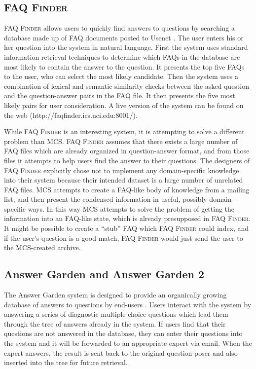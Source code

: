 \subsection{FAQ {\scshape Finder}}
FAQ {\scshape Finder} allows users to quickly find answers to questions by
searching a database made up of FAQ documents posted to Usenet \cite{Burke97}.
The user enters his or her question into the system in natural language. First
the system uses standard information retrieval techniques to determine which
FAQs in the database are most likely to contain the answer to the question. It
presents the top five FAQs to the user, who can select the most likely
candidate.  Then the system uses a combination of lexical and semantic
similarity checks between the asked question and the question-answer pairs in
the FAQ file. It then presents the five most likely pairs for user
consideration.  A live version of the system can be found on the web
(http://faqfinder.ics.uci.edu:8001/).

While FAQ {\scshape Finder} is an interesting system, it is attempting to solve
a different problem than MCS. FAQ {\scshape Finder} assumes that there exists a
large number of FAQ files which are already organized in question-answer
format, and from those files it attempts to help users find the answer to their
questions.  The designers of FAQ {\scshape Finder} explicitly chose not to
implement any domain-specific knowledge into their system because their
intended dataset is a large number of unrelated FAQ files. MCS attempts to
create a FAQ-like body of knowledge from a mailing list, and then present the
condensed information in useful, possibly domain-specific ways. In this way MCS
attempts to solve the problem of getting the information into an FAQ-like
state, which is already presupposed in FAQ {\scshape Finder}. It might be
possible to create a ``stub'' FAQ which FAQ {\scshape Finder} could index, and
if the user's question is a good match, FAQ {\scshape Finder} would just send
the user to the MCS-created archive.

\subsection{Answer Garden and Answer Garden 2}
\label{sec:answer-garden}
The Answer Garden system is designed to provide an organically growing database
of answers to questions by end-users \cite{Ackerman90}. Users interact with the
system by answering a series of diagnostic multiple-choice questions which lead
them through the tree of answers already in the system. If users find that
their questions are not answered in the database, they can enter their
questions into the system and it will be forwarded to an appropriate expert via
email. When the expert answers, the result is sent back to the original
question-poser and also inserted into the tree for future retrieval.

